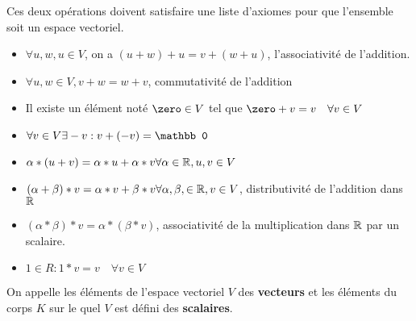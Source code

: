 \documentclass[12pt]{article}
\begin{document}
Ces deux opérations doivent satisfaire une liste d'axiomes pour que l'ensemble soit un espace vectoriel.
\begin{itemize}
    \item $\forall u,w,u \in V$, on a $(u+w)+u=v+(w+u)$, l'associativité de l'addition.
    \item $\forall u,w \in V, v+w = w+v$, commutativité de l'addition
    \item Il existe un élément noté $\zero \in V$ tel que $\zero +v = v \quad \forall v \in V$
    \item $\forall v \in V \space \exists -v : v + (-v) = \mathbb 0$
    \item $\alpha * (u+v) = \alpha*u+\alpha*v \space \forall \alpha \in \mathbb{R}, u,v \in V$
    \item $(\alpha + \beta) * v = \alpha * v + \beta * v \space \forall \alpha, \beta, \in \mathbb{R}, v \in V$, distributivité de l'addition dans $\mathbb{R}$
    \item $(\alpha*\beta)*v=\alpha*(\beta*v)$, associativité de la multiplication dans $\mathbb{R}$ par un scalaire.
    \item $1 \in R : 1*v=v \quad \forall v \in V$ 
\end{itemize}

On appelle les éléments de l'espace vectoriel $V$ des \textbf{vecteurs} et les éléments du corps $K$ sur le quel $V$ est défini des \textbf{scalaires}.
\end{document}
